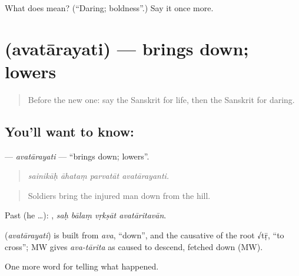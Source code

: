 \begin{tcolorbox}[breakable,colback=teal!4,colframe=teal!35!black,title={Before you move on}]
What does  mean? (\textquotedblleft{}Daring; boldness\textquotedblright{}.) Say it once more.
\end{tcolorbox}
\section[\texorpdfstring{\sk{अवतारयति} (avatārayati)}{अवतारयति (avatārayati)}]{ (avatārayati) — brings down; lowers}

\label{lesson:SA-C305-avatarayati}



\begin{quote}
Before the new one: say the Sanskrit for life, then the Sanskrit for daring.
\end{quote}

\subsection*{You'll want to know: }
\textbf{} — \emph{avatārayati} — \textquotedblleft{}brings down; lowers\textquotedblright{}.

\begin{quote}
   
\end{quote}

\begin{quote}
\emph{sainikāḥ āhataṃ parvatāt avatārayanti.}
\end{quote}

\begin{quote}
Soldiers bring the injured man down from the hill.
\end{quote}

Past (he …):    , \emph{saḥ bālaṃ vṛkṣāt avatāritavān}.

\begin{cousinweb}
\textbf{} (\emph{avatārayati}) is built from \emph{ava}, \textquotedblleft{}down\textquotedblright{}, and the causative of the root √tṝ, \textquotedblleft{}to cross\textquotedblright{}; MW gives \emph{ava-tārita} as caused to descend, fetched down (MW).
\end{cousinweb}

\begin{grammarlens}[title={What you've built}]
One more word for telling what happened.
\end{grammarlens}

